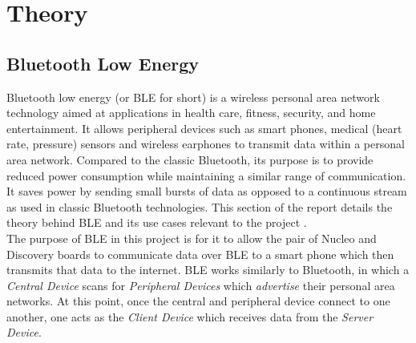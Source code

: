 \section{Theory}
\subsection{Bluetooth Low Energy}

Bluetooth low energy (or BLE for short) is a wireless personal area network technology aimed at applications in health care, fitness, security, and home entertainment. 
It allows peripheral devices such as smart phones, medical (heart rate, pressure) sensors and wireless earphones to transmit data within a personal area network. 
Compared to the classic Bluetooth, its purpose is to provide reduced power consumption while maintaining a similar range of communication. 
It saves power by sending small bursts of data as opposed to a continuous stream as used in classic Bluetooth technologies. 
This section of the report details the theory behind BLE and its use cases relevant to the project \cite{gatt}.\\

The purpose of BLE in this project is for it to allow the pair of Nucleo and Discovery boards to communicate data over BLE to a smart phone which then transmits that data to the internet. 
BLE works similarly to Bluetooth, in which a \textit{Central Device} scans for \textit{Peripheral Devices} which \textit{advertise} their personal area networks. 
At this point, once the central and peripheral device connect to one another, one acts as the \textit{Client Device} which receives data from the \textit{Server Device}.\\

